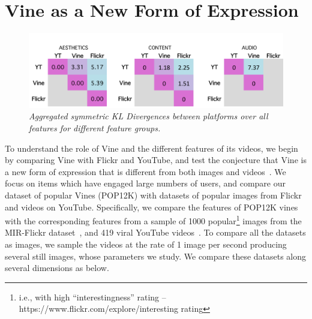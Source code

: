 
\section{Vine as a New Form of Expression}
\label{sec:new-vine-old-bottle}

\vspace{-2mm}
\begin{figure}[!htb]
\centering
\includegraphics[width=\columnwidth]{plots/comparison/table}
\caption{\textsl{ Aggregated symmetric KL Divergences between platforms over all features for different feature groups.}}
	\label{fig:comparisontable}
	\vspace{-2mm}

\end{figure}



To understand the role of Vine and the different features of its videos,  we begin by comparing Vine with Flickr and YouTube, and test the conjecture that Vine is a new form of expression that is different from both images and videos~\cite{pogue13}.  We focus on items which have engaged large numbers of users, and compare our dataset of popular Vines (POP12K) with datasets of popular images from Flickr and videos on YouTube.  Specifically, we compare the features of POP12K vines with the corresponding features from a sample of 1000 popular\footnote{i.e., with high  ``interestingness'' rating -- https://www.flickr.com/explore/interesting rating}  images from the MIR-Flickr dataset~\cite{huiskes08}, and 419 viral YouTube videos~\cite{Jiang:2014:VVS:2578726.2578754}. To compare all the datasets as images, we sample the videos at the rate of 1 image per second producing several still images, whose parameters we study. We compare these datasets along several dimensions as below.

